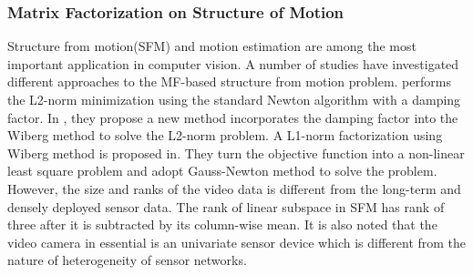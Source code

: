 \subsubsection{Matrix Factorization on Structure of Motion} 
Structure from motion(SFM)\cite{tomasi1992shape} and motion estimation are among the most important application in computer vision.   
A number of studies have investigated different approaches to the MF-based structure from motion problem. \cite{buchanan2005damped} performs the L2-norm minimization using the standard Newton algorithm with a damping factor. In \cite{deguchi2011efficient}, they propose a new method incorporates the damping factor into the Wiberg method to solve the L2-norm problem. A L1-norm factorization using Wiberg method is proposed in\cite{eriksson2010efficient}. They turn the objective function into a non-linear least square problem and adopt Gauss-Newton method to solve the problem. 
However, the size and ranks of the video data is different from the long-term and densely deployed sensor data. 
The rank of linear subspace in SFM has rank of three after it is subtracted by its column-wise mean. It is also noted that the video camera in essential is an univariate sensor device which is different from the nature of heterogeneity of sensor networks. 